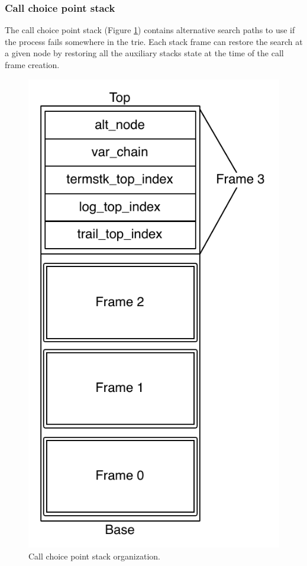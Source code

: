 \subsubsection{Call choice point stack}

The call choice point stack (Figure \ref{fig:call_choice_point_stack}) contains alternative
search paths to use if the process fails somewhere in the trie.
Each stack frame can restore the search at a given node by restoring all the auxiliary stacks state at the time
of the call frame creation.

\begin{figure}[ht]
  \centering
    \includegraphics[scale=0.6]{call_choice_point_stack.pdf}
  \caption{Call choice point stack organization.}
  \label{fig:call_choice_point_stack}
\end{figure}

